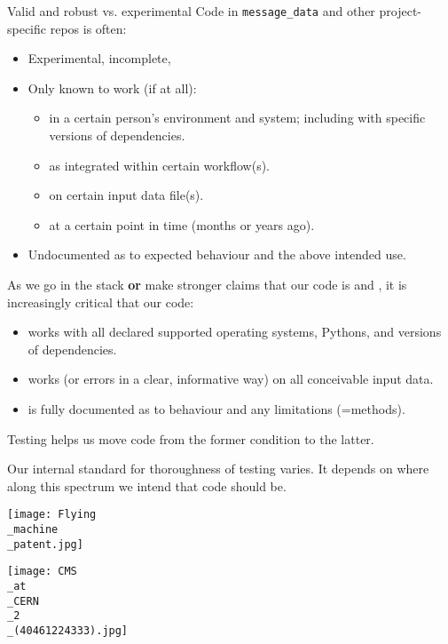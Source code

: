 \documentclass[12pt,aspectratio=169]{beamer}
\renewcommand{\mod}[1]{\texttt{#1}}
\begin{document}
\begin{frame}[allowframebreaks]{Valid and robust vs. experimental}
Code in \mod{message_data} and other project-specific repos is often:
\begin{itemize}
  \item Experimental, incomplete,
  \item Only known to work (if at all):
  \begin{itemize}
      \item in a certain person's environment and system; including with specific versions of dependencies.
      \item as integrated within certain workflow(s).
      \item on certain input data file(s).
      \item at a certain point in time (months or years ago).
  \end{itemize}
  \item Undocumented as to expected behaviour and the above intended use.
\end{itemize}

\framebreak
As we go  in the stack \textbf{or} make stronger claims that our code is  and , it is increasingly critical that our code:
\begin{itemize}
    \item works with all declared supported operating systems, Pythons, and versions of dependencies.
    \item works (or errors in a clear, informative way) on all conceivable input data.
    \item is fully documented as to behaviour and any limitations (=methods).
\end{itemize}

\bigskip
Testing helps us move code from the former condition to the latter.

\medskip
Our internal standard for thoroughness of testing varies.
It depends on where along this spectrum we intend that code should be.
\end{frame}

\begin{frame}[plain]

\texttt{[image: Flying\\\_machine\\\_patent.jpg]}

\end{frame}

\begin{frame}[plain]

\texttt{[image: CMS\\\_at\\\_CERN\\\_2\\\_(40461224333).jpg]}

\end{frame}
\end{document}
